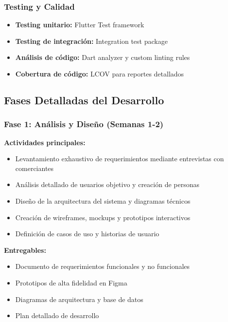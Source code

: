 \documentclass[12pt,a4paper]{report}
\begin{document}
\subsubsection{Testing y Calidad}
\begin{itemize}
	\item \textbf{Testing unitario:} Flutter Test framework
	\item \textbf{Testing de integración:} Integration test package
	\item \textbf{Análisis de código:} Dart analyzer y custom linting rules
	\item \textbf{Cobertura de código:} LCOV para reportes detallados
\end{itemize}

\subsection{Fases Detalladas del Desarrollo}

\subsubsection{Fase 1: Análisis y Diseño (Semanas 1-2)}
\textbf{Actividades principales:}
\begin{itemize}
	\item Levantamiento exhaustivo de requerimientos mediante entrevistas con comerciantes
	\item Análisis detallado de usuarios objetivo y creación de personas
	\item Diseño de la arquitectura del sistema y diagramas técnicos
	\item Creación de wireframes, mockups y prototipos interactivos
	\item Definición de casos de uso y historias de usuario
\end{itemize}

\textbf{Entregables:}
\begin{itemize}
	\item Documento de requerimientos funcionales y no funcionales
	\item Prototipos de alta fidelidad en Figma
	\item Diagramas de arquitectura y base de datos
	\item Plan detallado de desarrollo
\end{itemize}
\end{document}
